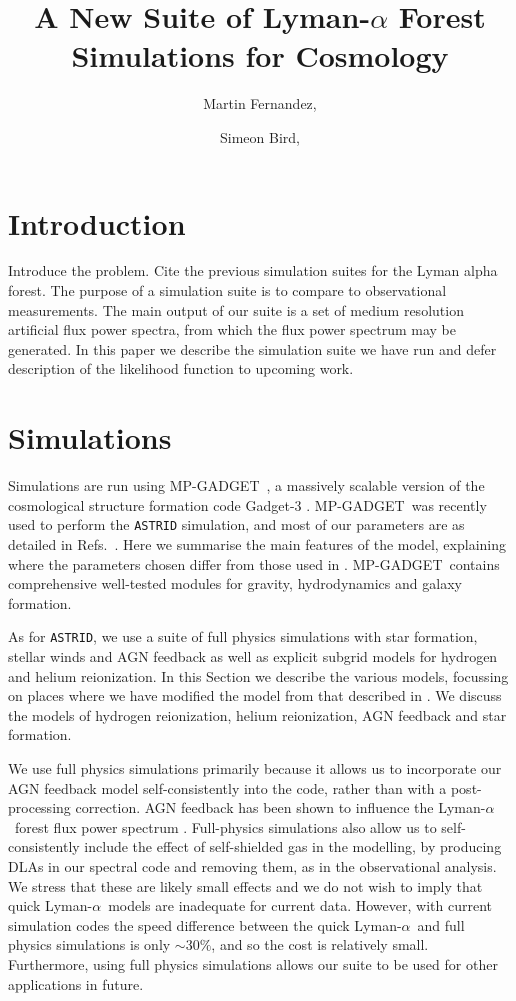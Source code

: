 \documentclass[a4paper,11pt]{article}
\title{A New Suite of Lyman-$\alpha$ Forest Simulations for Cosmology}
\author[a,1]{Martin Fernandez,\note{Corresponding author}}
\author[a]{Simeon Bird,}
\affiliation[a]{Department of Physics \& Astronomy, University of California  Riverside,\\900 University Avenue, Riverside, CA 92521, USA}
\newcommand{\Lya}{Lyman-$\alpha$}
\newcommand{\mpgadget}{{\small MP-GADGET}}
\begin{document}
\maketitle

\section{Introduction}

Introduce the problem. Cite the previous simulation suites for the Lyman alpha forest. The purpose of a simulation suite is to compare to observational measurements. The main output of our suite is a set of medium resolution artificial flux power spectra, from which the flux power spectrum may be generated. In this paper we describe the simulation suite we have run and defer description of the likelihood function to upcoming work.

\section{Simulations}

Simulations are run using \mpgadget~\cite{MPGadget2018, Bird:2022}, a massively scalable version of the cosmological structure formation code Gadget-3 \cite{Springel:2005}. \mpgadget~was recently used to perform the \texttt{ASTRID} simulation, and most of our parameters are as detailed in Refs.~\cite{Bird:2022, Ni:2021}. Here we summarise the main features of the model, explaining where the parameters chosen differ from those used in \cite{Bird:2022}. \mpgadget~contains comprehensive well-tested modules for gravity, hydrodynamics and galaxy formation.

As for \texttt{ASTRID}, we use a suite of full physics simulations with star formation, stellar winds and AGN feedback as well as explicit subgrid models for hydrogen and helium reionization. In this Section we describe the various models, focussing on places where we have modified the model from that described in \cite{Bird:2022}. We discuss the models of hydrogen reionization, helium reionization, AGN feedback and star formation.

We use full physics simulations primarily because it allows us to incorporate our AGN feedback model self-consistently into the code, rather than with a post-processing correction. AGN feedback has been shown to influence the \Lya~forest flux power spectrum \cite{Viel:2013, Chabanier:2020}. Full-physics simulations also allow us to self-consistently include the effect of self-shielded gas in the modelling, by producing DLAs in our spectral code and removing them, as in the observational analysis. We stress that these are likely small effects and we do not wish to imply that quick \Lya~models are inadequate for current data. However, with current simulation codes the speed difference between the quick \Lya~and full physics simulations is only $\sim 30\%$, and so the cost is relatively small. Furthermore, using full physics simulations allows our suite to be used for other applications in future.
\end{document}
